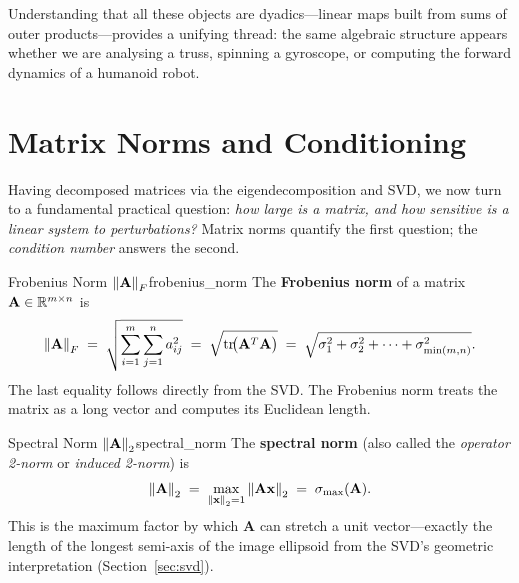 Understanding that all these objects are dyadics---linear maps built
from sums of outer products---provides a unifying thread: the same
algebraic structure appears whether we are analysing a truss, spinning
a gyroscope, or computing the forward dynamics of a humanoid robot.


\section{Matrix Norms and Conditioning}
\label{sec:matrix_norms}

Having decomposed matrices via the eigendecomposition and SVD, we now turn
to a fundamental practical question: \emph{how large is a matrix, and how
sensitive is a linear system to perturbations?}  Matrix norms quantify the
first question; the \emph{condition number} answers the second.

\begin{definition}{\texorpdfstring{Frobenius Norm $\left\lVert \mathbf{A} \right\rVert_F$}{Frobenius Norm}}{frobenius_norm}
The \textbf{Frobenius norm} of a matrix
$\mathbf{A}\in\mathbb{R}^{m\times n}$ is
\begin{equation}
  \label{eq:frobenius_norm}
  \left\lVert \mathbf{A} \right\rVert_F
  \;=\; \sqrt{\sum_{i=1}^{m}\sum_{j=1}^{n} a_{ij}^{2}}
  \;=\; \sqrt{\operatorname{tr}\!\bigl(\mathbf{A}^{T}\mathbf{A}\bigr)}
  \;=\; \sqrt{\sigma_1^{2}+\sigma_2^{2}+\cdots+\sigma_{\min(m,n)}^{2}}.
\end{equation}
The last equality follows directly from the SVD\@.  The Frobenius norm
treats the matrix as a long vector and computes its Euclidean length.
\end{definition}

\begin{definition}{\texorpdfstring{Spectral Norm $\left\lVert \mathbf{A} \right\rVert_2$}{Spectral Norm}}{spectral_norm}
The \textbf{spectral norm} (also called the
\emph{operator 2-norm} or \emph{induced 2-norm}) is
\begin{equation}
  \label{eq:spectral_norm}
  \left\lVert \mathbf{A} \right\rVert_2
  \;=\; \max_{\left\lVert \mathbf{x} \right\rVert_2=1} \left\lVert \mathbf{A}\mathbf{x} \right\rVert_2
  \;=\; \sigma_{\max}(\mathbf{A}).
\end{equation}
This is the maximum factor by which $\mathbf{A}$ can stretch a unit
vector---exactly the length of the longest semi-axis of the image
ellipsoid from the SVD's geometric interpretation
(Section~\ref{sec:svd}).
\end{definition}

